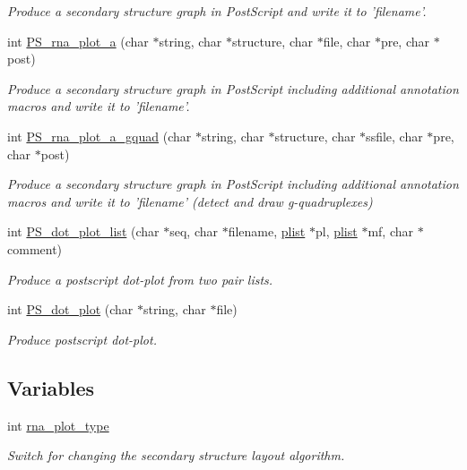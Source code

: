 \begin{DoxyCompactItemize}
\begin{DoxyCompactList}\small\item\em Produce a secondary structure graph in Post\-Script and write it to 'filename'. \end{DoxyCompactList}\item 
int \hyperlink{group__plotting__utils_ga47856b2504b566588785597b6ebb8271}{P\-S\-\_\-rna\-\_\-plot\-\_\-a} (char $\ast$string, char $\ast$structure, char $\ast$file, char $\ast$pre, char $\ast$post)
\begin{DoxyCompactList}\small\item\em Produce a secondary structure graph in Post\-Script including additional annotation macros and write it to 'filename'. \end{DoxyCompactList}\item 
int \hyperlink{group__plotting__utils_ga32fa0f97625119e9d24dd2e7153abc4f}{P\-S\-\_\-rna\-\_\-plot\-\_\-a\-\_\-gquad} (char $\ast$string, char $\ast$structure, char $\ast$ssfile, char $\ast$pre, char $\ast$post)
\begin{DoxyCompactList}\small\item\em Produce a secondary structure graph in Post\-Script including additional annotation macros and write it to 'filename' (detect and draw g-\/quadruplexes) \end{DoxyCompactList}\item 
int \hyperlink{group__plotting__utils_ga00ea223b5cf02eb2faae5ff29f0d5e12}{P\-S\-\_\-dot\-\_\-plot\-\_\-list} (char $\ast$seq, char $\ast$filename, \hyperlink{group__data__structures_gab1d8894b43aa84cbc50b862a73785fbc}{plist} $\ast$pl, \hyperlink{group__data__structures_gab1d8894b43aa84cbc50b862a73785fbc}{plist} $\ast$mf, char $\ast$comment)
\begin{DoxyCompactList}\small\item\em Produce a postscript dot-\/plot from two pair lists. \end{DoxyCompactList}\item 
int \hyperlink{group__plotting__utils_ga689a97a7e3b8a2df14728b8204d9d57b}{P\-S\-\_\-dot\-\_\-plot} (char $\ast$string, char $\ast$file)
\begin{DoxyCompactList}\small\item\em Produce postscript dot-\/plot. \end{DoxyCompactList}\end{DoxyCompactItemize}
\subsection*{Variables}
\begin{DoxyCompactItemize}
\item 
int \hyperlink{group__plotting__utils_ga5964c4581431b098b80027d6e14dcdd4}{rna\-\_\-plot\-\_\-type}
\begin{DoxyCompactList}\small\item\em Switch for changing the secondary structure layout algorithm. \end{DoxyCompactList}\end{DoxyCompactItemize}


